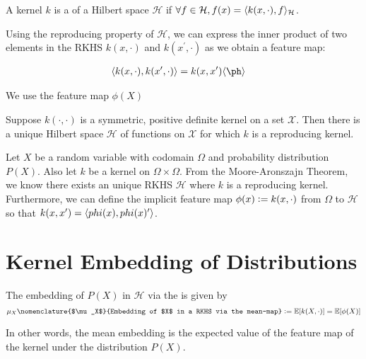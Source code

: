\begin{definition}
	A kernel $k$ is a  of a Hilbert space $\mathcal{H}$ if $\forall f \in \mathcal{H}, f(x) = \langle k(x, \cdot), f\rangle_\mathcal{H}$.
\end{definition}

Using the reproducing property of $\mathcal{H}$, we can express the inner product of two elements in the RKHS $k(x, \cdot)$ and $k(x^\prime, \cdot)$ as we obtain a feature map:

\begin{align}
	\innerProd{k(x, \cdot), k(x^\prime, \cdot)} &= k(x, x^\prime)
    \innerProd{\ph}
\end{align}

We use the feature map $\phi(X)$



\begin{theorem}
Suppose $k(\cdot, \cdot)$ is a symmetric, positive definite kernel on a set $\mathcal{X}$. Then there is a unique Hilbert space $\mathcal{H}$ of functions on $\mathcal{X}$ for which $k$ is a reproducing kernel.
\end{theorem}

Let $X$ be a random variable with codomain $\Omega$ and probability distribution $P(X)$. Also let $k$ be a kernel on $\Omega \times \Omega$. From the Moore-Aronszajn Theorem, we know there exists an unique RKHS $\mathcal{H}$ where $k$ is a reproducing kernel. Furthermore, we can define the implicit feature map $\phi(x) \vcentcolon= k(x, \cdot)$ from $\Omega$ to $\mathcal{H}$ so that $k(x, x^\prime) = \langle phi(x), phi(x)^\prime\rangle$.

\section{Kernel Embedding of Distributions}

\begin{definition}
The embedding of $P(X)$ in $\mathcal{H}$ via the  is given by
\begin{equation}
  \mu_{X}\nomenclature{$\mu_X$}{Embedding of $X$ in a RKHS via the mean-map} \defeq \E[k(X, \cdot)] = \E[\phi(X)]
\end{equation}
\end{definition}

In other words, the mean embedding is the expected value of the feature map of the kernel under the distribution $P(X)$.

